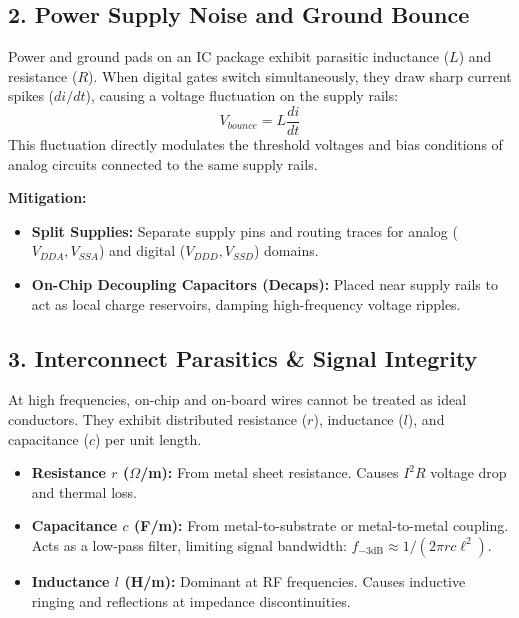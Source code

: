 \documentclass[12pt,a4paper]{article}
\begin{document}
\subsection{2. Power Supply Noise and Ground Bounce}
Power and ground pads on an IC package exhibit parasitic inductance ($L$) and resistance ($R$). When digital gates switch simultaneously, they draw sharp current spikes ($di/dt$), causing a voltage fluctuation on the supply rails:
\[
V_{bounce} = L \frac{di}{dt}
\]
This fluctuation directly modulates the threshold voltages and bias conditions of analog circuits connected to the same supply rails.

\textbf{Mitigation:}
\begin{itemize}[leftmargin=*, itemsep=2pt]
  \item \textbf{Split Supplies:} Separate supply pins and routing traces for analog ($V_{DDA}, V_{SSA}$) and digital ($V_{DDD}, V_{SSD}$) domains.
  \item \textbf{On-Chip Decoupling Capacitors (Decaps):} Placed near supply rails to act as local charge reservoirs, damping high-frequency voltage ripples.
\end{itemize}

\subsection{3. Interconnect Parasitics \& Signal Integrity}
At high frequencies, on-chip and on-board wires cannot be treated as ideal conductors. They exhibit distributed resistance ($r$), inductance ($l$), and capacitance ($c$) per unit length.

\begin{tcolorbox}[defbox, title={\textbf{Interconnect Lumped RLC Model}}]
\begin{itemize}[leftmargin=*, itemsep=2pt, topsep=0pt]
  \item \textbf{Resistance $r$ ($\Omega$/m):} From metal sheet resistance. Causes $I^2R$ voltage drop and thermal loss.
  \item \textbf{Capacitance $c$ (F/m):} From metal-to-substrate or metal-to-metal coupling. Acts as a low-pass filter, limiting signal bandwidth: $f_{-3\text{dB}} \approx 1/(2\pi r c \ell^2)$.
  \item \textbf{Inductance $l$ (H/m):} Dominant at RF frequencies. Causes inductive ringing and reflections at impedance discontinuities.
\end{itemize}
\end{tcolorbox}
\end{document}
